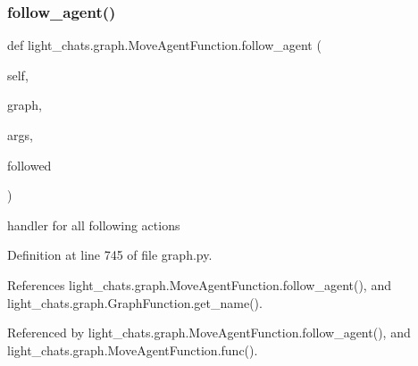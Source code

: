 \subsubsection{\texorpdfstring{follow\+\_\+agent()}{follow\_agent()}}
{\footnotesize\ttfamily def light\+\_\+chats.\+graph.\+Move\+Agent\+Function.\+follow\+\_\+agent (\begin{DoxyParamCaption}\item[{}]{self,  }\item[{}]{graph,  }\item[{}]{args,  }\item[{}]{followed }\end{DoxyParamCaption})}

\begin{DoxyVerb}handler for all following actions\end{DoxyVerb}
 

Definition at line 745 of file graph.\+py.



References light\+\_\+chats.\+graph.\+Move\+Agent\+Function.\+follow\+\_\+agent(), and light\+\_\+chats.\+graph.\+Graph\+Function.\+get\+\_\+name().



Referenced by light\+\_\+chats.\+graph.\+Move\+Agent\+Function.\+follow\+\_\+agent(), and light\+\_\+chats.\+graph.\+Move\+Agent\+Function.\+func().

